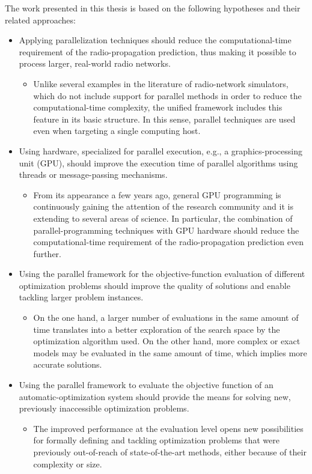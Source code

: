The work presented in this thesis is based on the following hypotheses
and their related approaches:
\begin{itemize}
\item Applying parallelization techniques should reduce the computational-time
requirement of the radio-propagation prediction, thus making it possible
to process larger, real-world radio networks.

\begin{itemize}
\item Unlike several examples in the literature of radio-network simulators,
which do not include support for parallel methods in order to reduce
the computational-time complexity, the unified framework includes
this feature in its basic structure. In this sense, parallel techniques
are used even when targeting a single computing host.
\end{itemize}
\item Using hardware, specialized for parallel execution, e.g., a graphics-processing
unit (GPU), should improve the execution time of parallel algorithms
using threads or message-passing mechanisms.

\begin{itemize}
\item From its appearance a few years ago, general GPU programming is continuously
gaining the attention of the research community and it is extending
to several areas of science. In particular, the combination of parallel-programming
techniques with GPU hardware should reduce the computational-time
requirement of the radio-propagation prediction even further.
\end{itemize}
\item Using the parallel framework for the objective-function evaluation
of different optimization problems should improve the quality of solutions
and enable tackling larger problem instances.

\begin{itemize}
\item On the one hand, a larger number of evaluations in the same amount
of time translates into a better exploration of the search space by
the optimization algorithm used. On the other hand, more complex or
exact models may be evaluated in the same amount of time, which implies
more accurate solutions.
\end{itemize}
\item Using the parallel framework to evaluate the objective function of
an automatic-optimization system should provide the means for solving
new, previously inaccessible optimization problems.

\begin{itemize}
\item The improved performance at the evaluation level opens new possibilities
for formally defining and tackling optimization problems that were
previously out-of-reach of state-of-the-art methods, either because
of their complexity or size.
\end{itemize}
\end{itemize}

